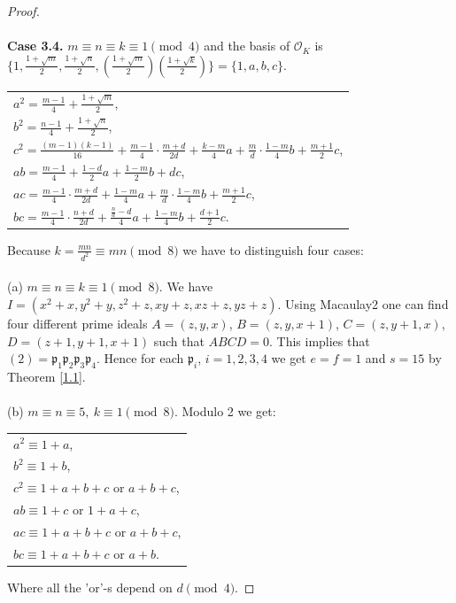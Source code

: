 \documentclass[12pt]{article}
\theoremstyle{remark}
\begin{document}
\begin{proof}
\\ \\
\textbf{Case 3.4.}  $ m\equiv n \equiv k \equiv 1 \pmod{4}$ and the basis of $\mathcal{O}_K$ is $\{1, \frac{1+\sqrt{m}}{2}, \frac{1+\sqrt{n}}{2},(\frac{1+\sqrt{m}}{2})(\frac{1+\sqrt{k}}{2})  \} = \{1,a,b,c\}$. 
\begin{center}
\begin{tabular}{@{}l@{}}
$a^2 = \frac{m-1}{4} + \frac{1+\sqrt{m}}{2}   $,\\
$b^2 = \frac{n-1}{4} + \frac{1+\sqrt{n}}{2}   $,\\
$c^2  =  \frac{(m-1)(k-1)}{16}  + \frac{m-1}{4} \cdot \frac{m+d}{2d} + \frac{k-m}{4}a + \frac{m}{d} \cdot \frac{1-m}{4}b + \frac{m+1}{2}c  $,\\
$ab = \frac{m-1}{4} + \frac{1-d}{2}a + \frac{1-m}{2}b + dc $,\\
$ac = \frac{m-1}{4} \cdot \frac{m+d}{2d} + \frac{1-m}{4}a + \frac{m}{d} \cdot \frac{1-m}{4}b + \frac{m+1}{2}c  $,\\
$bc = \frac{m-1}{4} \cdot \frac{n+d}{2d} +  \frac{\frac{n}{d}-d}{4}a + \frac{1-m}{4}b+ \frac{d+1}{2}c  $.
\end{tabular}
\end{center}
Because $k = \frac{mn}{d^2} \equiv mn \pmod{8}$ we have to distinguish four cases:
\\ \\
(a) $m \equiv n \equiv k \equiv 1 \pmod{8}$. We have $I = (x^2+x,y^2+y,z^2+z,xy+z,xz+z,yz+z)$. Using Macaulay2 one can find four different prime ideals $A = (z,y,x)$, $B = (z,y,x+1) $, $C = (z,y+1,x)$, $D = (z+1,y+1,x+1) $ such that $ABCD = 0.$ This implies that $ (2) = \mathfrak{p}_1\mathfrak{p}_2\mathfrak{p}_3\mathfrak{p}_4$. Hence for each $\mathfrak{p}_i$, $i=1,2,3,4$ we get $ e=f=1$ and $ s=15$ by Theorem \ref{1.1}.
\\ \\
(b) $m \equiv n \equiv 5,\  k \equiv 1 \pmod{8}$. Modulo 2 we get:
\begin{center}
\begin{tabular}{@{}l@{}}
$a^2 \equiv 1 +a$,\\
$b^2 \equiv 1 + b$,\\
$c^2 \equiv 1 +a + b + c \text{ or }  a + b + c$, \\
$ab \equiv 1+c \text{ or } 1+a+c$, \\
$ac \equiv  1+a + b + c \text{ or }  a + b + c$, \\
$bc \equiv 1+a + b + c \text{ or } a + b $.
\end{tabular}
\end{center}
Where all the 'or'-s depend on $d \pmod{4}$.


\end{proof}
\end{document}
